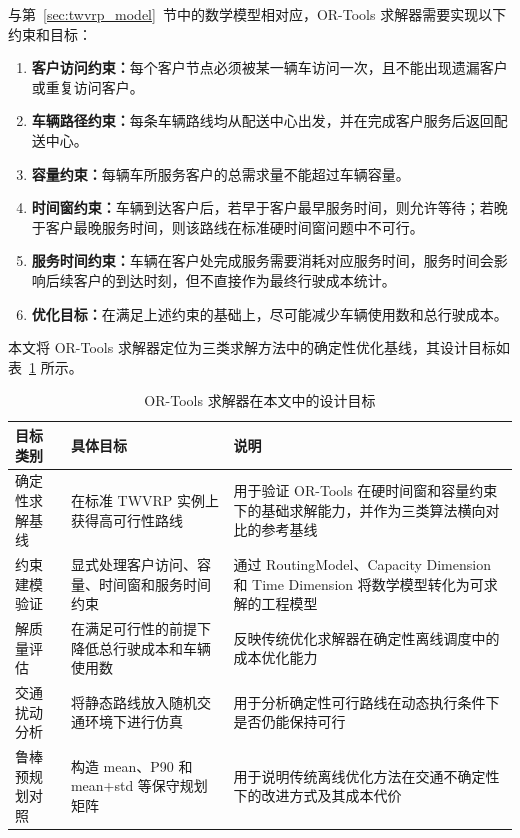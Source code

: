 \documentclass[12pt,a4paper,UTF8]{article}
\begin{document}
与第~\ref{sec:twvrp_model}~节中的数学模型相对应，OR-Tools 求解器需要实现以下约束和目标：

\begin{enumerate}
    \item \textbf{客户访问约束：}每个客户节点必须被某一辆车访问一次，且不能出现遗漏客户或重复访问客户。
    
    \item \textbf{车辆路径约束：}每条车辆路线均从配送中心出发，并在完成客户服务后返回配送中心。
    
    \item \textbf{容量约束：}每辆车所服务客户的总需求量不能超过车辆容量。
    
    \item \textbf{时间窗约束：}车辆到达客户后，若早于客户最早服务时间，则允许等待；若晚于客户最晚服务时间，则该路线在标准硬时间窗问题中不可行。
    
    \item \textbf{服务时间约束：}车辆在客户处完成服务需要消耗对应服务时间，服务时间会影响后续客户的到达时刻，但不直接作为最终行驶成本统计。
    
    \item \textbf{优化目标：}在满足上述约束的基础上，尽可能减少车辆使用数和总行驶成本。
\end{enumerate}

本文将 OR-Tools 求解器定位为三类求解方法中的确定性优化基线，其设计目标如表~\ref{tab:ortools_design_goal} 所示。

\begin{table}[!htbp]
    \centering
    \caption{OR-Tools 求解器在本文中的设计目标}
    \label{tab:ortools_design_goal}
    \small
    \begin{tabularx}{\textwidth}{p{3.2cm} p{4.2cm} X}
        \toprule
        目标类别 & 具体目标 & 说明 \\
        \midrule
        确定性求解基线 &
        在标准 TWVRP 实例上获得高可行性路线 &
        用于验证 OR-Tools 在硬时间窗和容量约束下的基础求解能力，并作为三类算法横向对比的参考基线 \\
        \midrule
        约束建模验证 &
        显式处理客户访问、容量、时间窗和服务时间约束 &
        通过 RoutingModel、Capacity Dimension 和 Time Dimension 将数学模型转化为可求解的工程模型 \\
        \midrule
        解质量评估 &
        在满足可行性的前提下降低总行驶成本和车辆使用数 &
        反映传统优化求解器在确定性离线调度中的成本优化能力 \\
        \midrule
        交通扰动分析 &
        将静态路线放入随机交通环境下进行仿真 &
        用于分析确定性可行路线在动态执行条件下是否仍能保持可行 \\
        \midrule
        鲁棒预规划对照 &
        构造 mean、P90 和 mean+std 等保守规划矩阵 &
        用于说明传统离线优化方法在交通不确定性下的改进方式及其成本代价 \\
        \bottomrule
    \end{tabularx}
\end{table}
\end{document}
